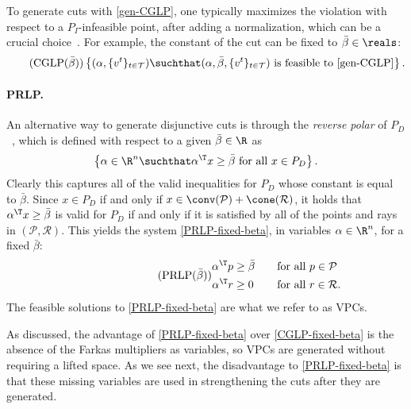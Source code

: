 \documentclass[oribibl,envcountsame]{llncs}
\theoremstyle{remark}
\theoremstyle{definition}
\newcommand{\rlaptext}[1]{\rlap{\text{#1}}}
\newcommand{\pointset}{\mathcal{P}}
\newcommand{\rayset}{\mathcal{R}}
\newcommand{\PI}{P_{I}}
\newcommand{\PD}{P_{D}}
\newcommand{\disjTermsIndexSet}{\mathcal{T}}
\begin{document}
To generate cuts with \eqref{gen-CGLP},
one typically maximizes the violation with respect to a $\PI$-infeasible point, 
after adding a normalization, which can be a crucial choice~\cite{FisLodTra11}.
For example, the constant of the cut can be fixed to $\bar{\beta} \in \reals$:
  \begin{equation}
  \label{CGLP-fixed-beta}
  \tag{CGLP($\bar{\beta}$)}
    \left\{(
        \alpha,\{v^t\}_{t \in \disjTermsIndexSet}) 
        \suchthat 
        (\alpha,\bar{\beta},\{v^t\}_{t \in \disjTermsIndexSet}) 
        \text{ is feasible to \eqref{gen-CGLP}}
    \right\}.
  \end{equation}




\paragraph{PRLP.}
An alternative way to generate disjunctive cuts is through the \emph{reverse polar} of $\PD$~\cite[Section~5]{Balas79}, which is defined with respect to a given $\bar{\beta} \in \R$ as 
  \begin{equation*}
    \left\{ 
        \alpha \in \R^n \suchthat \alpha^\T x \ge \bar{\beta} \text{ for all $x \in \PD$} 
    \right\}.
  \end{equation*}
Clearly this captures all of the valid inequalities for $\PD$ whose constant is equal to $\bar{\beta}$.
Since $x \in \PD$ if and only if $x \in \conv(\pointset) + \cone(\rayset)$, it holds that $\alpha^\T x \ge \bar{\beta}$ is valid for $\PD$ if and only if it is satisfied by all of the points and rays in $(\pointset,\rayset)$.
This yields the system \eqref{PRLP-fixed-beta}, in variables $\alpha \in \R^n$, for a fixed $\bar{\beta}$:
  \begin{align}
  \label{PRLP-fixed-beta}
  \tag{PRLP($\bar{\beta}$)}
  \begin{aligned}
    \alpha^\T p &\ge \bar{\beta} &\quad& \rlaptext{for all $p \in \pointset$} \\
    \alpha^\T r &\ge 0 &\quad& \rlaptext{for all $r \in \rayset$.}
  \end{aligned}
  \end{align}
The feasible solutions to \cref{PRLP-fixed-beta} are what we refer to as VPCs.
  
As discussed, the advantage of \eqref{PRLP-fixed-beta} over \eqref{CGLP-fixed-beta} is the absence of the Farkas multipliers as variables, so VPCs are generated without requiring a lifted space.
As we see next, the disadvantage to \cref{PRLP-fixed-beta} is that these missing variables are used in strengthening the cuts after they are generated.
\end{document}
